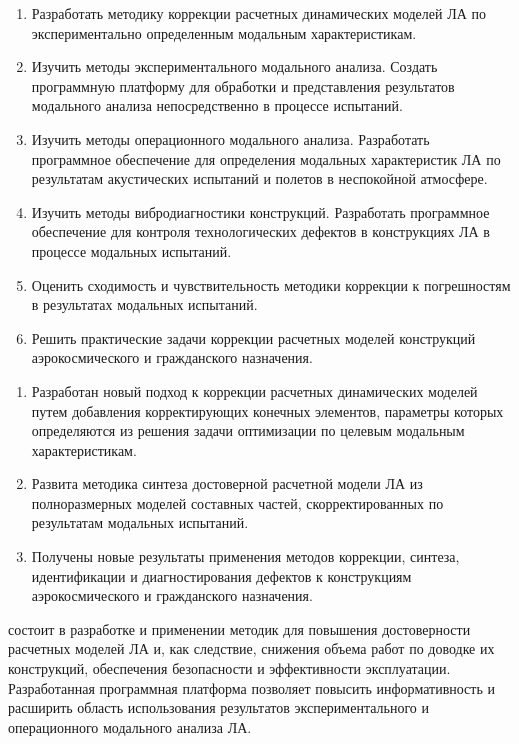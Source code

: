 {\tasks}
\begin{enumerate}[beginpenalty = 10000] 
	\item Разработать методику коррекции расчетных динамических моделей ЛА по экспериментально определенным модальным характеристикам.
	\item Изучить методы экспериментального модального анализа. Создать программную платформу для обработки и представления результатов модального анализа непосредственно в процессе испытаний. 
	\item Изучить методы операционного модального анализа. Разработать программное обеспечение для определения модальных характеристик ЛА по результатам акустических испытаний и полетов в неспокойной атмосфере.
	\item Изучить методы вибродиагностики конструкций. Разработать программное обеспечение для контроля технологических дефектов в конструкциях ЛА в процессе модальных испытаний. 
	\item Оценить сходимость и чувствительность методики коррекции к погрешностям в результатах модальных испытаний. 
	\item Решить практические задачи коррекции расчетных моделей конструкций аэрокосмического и гражданского назначения.
\end{enumerate}

{\novelty}
\begin{enumerate}[beginpenalty = 10000] 
	\item Разработан новый подход к коррекции расчетных динамических моделей путем добавления корректирующих конечных элементов, параметры которых определяются из решения задачи оптимизации по целевым модальным характеристикам.
	\item Развита методика синтеза достоверной расчетной модели ЛА из полноразмерных моделей составных частей, скорректированных по результатам модальных испытаний.
	\item Получены новые результаты применения методов коррекции, синтеза, идентификации и диагностирования дефектов к конструкциям аэрокосмического и гражданского назначения.
\end{enumerate}

{\influence} состоит в разработке и применении методик для повышения достоверности расчетных моделей ЛА и, как следствие, снижения объема работ по доводке их конструкций, обеспечения безопасности и эффективности эксплуатации. Разработанная программная платформа позволяет повысить информативность и расширить область использования результатов экспериментального и операционного модального анализа ЛА.

